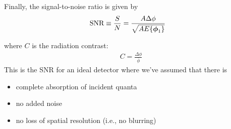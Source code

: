 \documentclass[mphy386-notes.tex]{subfiles}
\begin{document}
Finally, the signal-to-noise ratio is given by
 \begin{align}
   \text{SNR} &\equiv \frac{S}{N} = \frac{A\Delta\phi}{\sqrt{AE\{\boldsymbol{\phi}_1\}}}
 \end{align}   
 
where $C$ is the radiation contrast:
\begin{align}
  C = \frac{\Delta\phi}{\bar{\phi}}
\end{align}
This is the SNR for an ideal detector where we've assumed that there is
\begin{itemize}
\item complete absorption of incident quanta
\item no added noise
\item no loss of spatial resolution (i.e., no blurring)
\end{itemize}


\pagebreak
\end{document}
